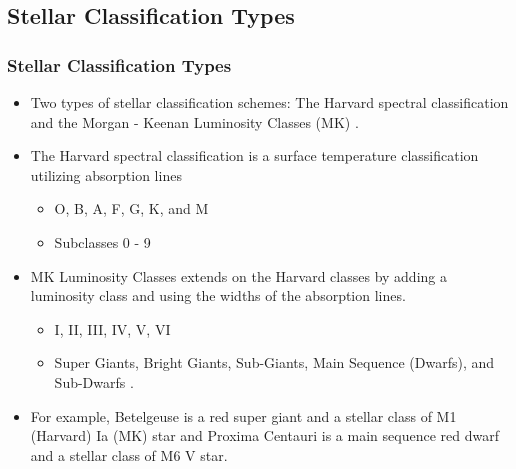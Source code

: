 \documentclass[aspectratio=169]{beamer}
\begin{document}
\subsection{Stellar Classification Types}
\begin{frame}
\frametitle{Stellar Classification Types}

\begin{itemize}
\item Two types of stellar classification schemes: The Harvard spectral classification and the Morgan - Keenan Luminosity Classes (MK) \cite{Carroll}.
\item The Harvard spectral classification is a surface temperature classification utilizing absorption lines
	\begin{itemize}
		\item O, B, A, F, G, K, and M
		\item Subclasses 0 - 9
	\end{itemize}
\item MK Luminosity Classes extends on the Harvard classes by adding a luminosity class and using the widths of the absorption lines.
	\begin{itemize}
		\item I, II, III, IV, V, VI
		\item Super Giants, Bright Giants, Sub-Giants, Main Sequence (Dwarfs), and Sub-Dwarfs \cite{Carroll}.
	\end{itemize}
\item For example, Betelgeuse is a red super giant and a stellar class of M1 (Harvard) Ia (MK) star and Proxima Centauri is a main sequence red dwarf and a stellar class of M6 V star. 
\end{itemize}

\end{frame}
\end{document}
